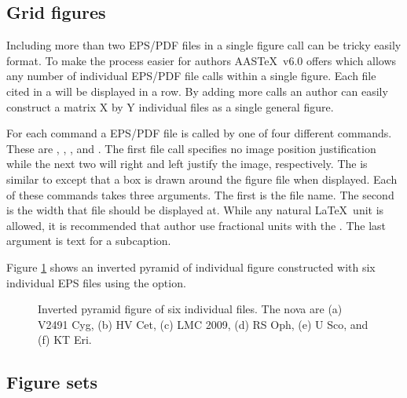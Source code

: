 \documentclass{aastex6}
\newcommand\aastex{AAS\TeX}
\newcommand\latex{La\TeX}
\begin{document}
\subsection{Grid figures}

Including more than two EPS/PDF files in a single figure call can be tricky
easily format.  To make the process easier for authors \aastex\ v6.0 offers
{\tt\string\girdline} which allows any number of individual EPS/PDF file
calls within a single figure.  Each file cited in a {\tt\string\girdline}
will be displayed in a row.  By adding more {\tt\string\girdline} calls an
author can easily construct a matrix X by Y individual files as a
single general figure.

For each {\tt\string\girdline} command a EPS/PDF file is called by one of
four different commands.  These are {\tt\string\fig},
{\tt\string\rightfig}, {\tt\string\leftfig}, and {\tt\string\boxedfig}.
The first file call specifies no image position justification while the
next two will right and left justify the image, respectively.  The
{\tt\string\boxedfig} is similar to {\tt\string\fig} except that a box is
drawn around the figure file when displayed. Each of these commands takes
three arguments.  The first is the file name.  The second is the width that
file should be displayed at.  While any natural \latex\ unit is allowed, it
is recommended that author use fractional units with the
{\tt\string\textwidth}.  The last argument is text for a subcaption.

Figure \ref{fig:pyramid} shows an inverted pyramid of individual
figure constructed with six individual EPS files using the
{\tt\string\girdline} option.

\begin{figure}
\caption{Inverted pyramid figure of six individual files. The nova are
(a) V2491 Cyg, (b) HV Cet, (c) LMC 2009, (d) RS Oph, (e) U Sco, and
(f) KT Eri.\label{fig:pyramid}}
\end{figure}

\subsection{Figure sets}
\end{document}
